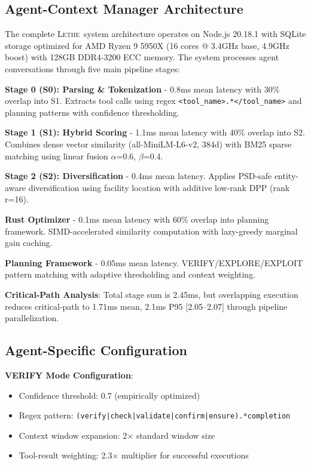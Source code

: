 \documentclass[letterpaper]{article}
\newcommand{\lethe}{\textsc{Lethe}}
\begin{document}
\subsection{Agent-Context Manager Architecture}

The complete \lethe\ system architecture operates on Node.js 20.18.1 with SQLite storage optimized for AMD Ryzen 9 5950X (16 cores @ 3.4GHz base, 4.9GHz boost) with 128GB DDR4-3200 ECC memory. The system processes agent conversations through five main pipeline stages:

\textbf{Stage 0 (S0): Parsing \& Tokenization} - 0.8ms mean latency with 30\% overlap into S1. Extracts tool calls using regex \texttt{<tool\_name>.*</tool\_name>} and planning patterns with confidence thresholding.

\textbf{Stage 1 (S1): Hybrid Scoring} - 1.1ms mean latency with 40\% overlap into S2. Combines dense vector similarity (all-MiniLM-L6-v2, 384d) with BM25 sparse matching using linear fusion $\alpha$=0.6, $\beta$=0.4.

\textbf{Stage 2 (S2): Diversification} - 0.4ms mean latency. Applies PSD-safe entity-aware diversification using facility location with additive low-rank DPP (rank r=16).

\textbf{Rust Optimizer} - 0.1ms mean latency with 60\% overlap into planning framework. SIMD-accelerated similarity computation with lazy-greedy marginal gain caching.

\textbf{Planning Framework} - 0.05ms mean latency. VERIFY/EXPLORE/EXPLOIT pattern matching with adaptive thresholding and context weighting.

\textbf{Critical-Path Analysis}: Total stage sum is 2.45ms, but overlapping execution reduces critical-path to 1.71ms mean, 2.1ms P95 [2.05–2.07] through pipeline parallelization.

\subsection{Agent-Specific Configuration}

\textbf{VERIFY Mode Configuration}:
\begin{itemize}
    \item Confidence threshold: 0.7 (empirically optimized)
    \item Regex pattern: \texttt{(verify|check|validate|confirm|ensure).*completion}
    \item Context window expansion: 2× standard window size
    \item Tool-result weighting: 2.3× multiplier for successful executions
\end{itemize}
\end{document}
